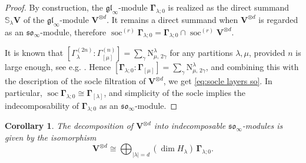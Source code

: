 \documentclass[12pt,reqno]{amsart}
\numberwithin{equation}{section}
\theoremstyle{plain}
\newtheorem{cor}[thm]{Corollary}
\theoremstyle{definition}
\def\gl{\mathfrak{gl}}
\def\so{\mathfrak{so}}
\def\LR{\mathrm N}
\def\soc{\operatorname{soc}}
\def\o{\otimes}
\def\glV_#1{\boldsymbol\Gamma_{#1}}
\def\soV_#1{\boldsymbol\Gamma_{[#1]}}
\def\VV{\mathbf V}
\begin{document}
\begin{proof}
By construction, the $\gl_\infty$-module $\glV_{\lambda;0}$ is
realized as the direct summand $\mathbb S_{\lambda} \VV$ of the
$\gl_\infty$-module $\VV^{\o d}$. It remains a direct summand when
$\VV^{\o d}$ is regarded as an $\so_\infty$-module, therefore $\soc^{(r)}
\glV_{\lambda;0} = \glV_{\lambda;0} \cap \soc^{(r)} \VV^{\o d}$.

It is known that
$[\varGamma_{\lambda}^{(2n)} : \varGamma_{[\mu]}^{(n)}] =
\sum_{\gamma} \LR_{\mu, \, 2\gamma}^{\lambda}$ for any partitions $\lambda,\mu$, provided $n$ is
large enough, see e.g. \cite{HTW}. Hence
$[\glV_{\lambda; 0} : \soV_{\mu}] = \sum_{\gamma} \LR_{\mu, \,
2\gamma}^{\lambda}$, and combining this with the description of the
socle filtration of $\VV^{\o d}$, we get \eqref{eq:socle layers so}.
In particular, $\soc \glV_{\lambda;0} \cong \soV_{\lambda}$, and
simplicity of the socle implies the indecomposability of
$\glV_{\lambda;0}$ as an $\so_\infty$-module.
\end{proof}

\begin{cor}
The decomposition of $\VV^{\o d}$ into indecomposable
$\so_\infty$-modules is given by the isomorphism
\begin{equation*}
    \VV^{\o d} \cong \bigoplus_{|\lambda| = d} (\dim H_\lambda) \, \glV_{\lambda;0}.
\end{equation*}
\end{cor}

\bigskip
\end{document}
